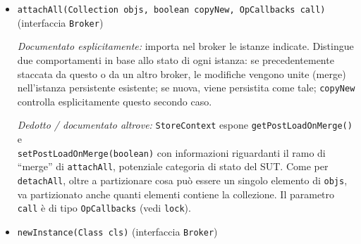 \begin{itemize}[itemsep=12pt, parsep=7pt]
    \textit{Dedotto / documentato altrove:} tramite collegamento con il Javadoc di
    \texttt{Broker.isDetached(Object obj)} si può affermare che ogni istanza restituita
    soddisfa \texttt{isDetached(e)=true}. \texttt{Broker} espone altri due overload di \texttt{detachAll}: uno
    senza collezione (stacca tutti gli oggetti gestiti, con flush sempre eseguito prima) e
    uno con un parametro \texttt{flush} booleano che rende quel flush opzionale. Il flush cui questi overload si
    riferiscono è documentato dal metodo pubblico \texttt{Broker.flush()}. \texttt{Broker} estende anche
    \texttt{DetachState}, che dichiara le modalità di detach (\texttt{DETACH\_FETCH\_GROUPS}:
    solo i campi del fetch group corrente; \texttt{DETACH\_LOADED}: tutti i campi già
    caricati; \texttt{DETACH\_ALL}: tutti i campi). \texttt{StoreContext} espone la coppia
    \texttt{getDetachState()}/\texttt{setDetachState(int)}, il cui Javadoc documenta il
    default: \texttt{DETACH\_LOADED}. Oltre a partizionare cosa può essere un singolo
    elemento di \texttt{objs} (istanza valida, nulla, ecc.), il tipo dichiarato
    (\texttt{Collection}) permette di partizionare anche quanti elementi contiene la
    collezione. Il
    parametro \texttt{call} è di tipo \texttt{OpCallbacks} (vedi \texttt{lock}).

    \item \texttt{attachAll(Collection objs, boolean copyNew, OpCallbacks call)}
    (interfaccia \texttt{Broker})

    \textit{Documentato esplicitamente:} importa nel broker le istanze indicate. Distingue
    due comportamenti in base allo stato di ogni istanza: se precedentemente staccata da
    questo o da un altro broker, le modifiche vengono unite (merge) nell'istanza persistente
    esistente; se nuova, viene persistita come tale; \texttt{copyNew} controlla
    esplicitamente questo secondo caso.

    \textit{Dedotto / documentato altrove:} \texttt{StoreContext} espone
    \texttt{getPostLoadOnMerge()} e \\ \texttt{setPostLoadOnMerge(boolean)} con informazioni riguardanti il ramo di
    ``merge'' di \texttt{attachAll}, potenziale categoria di stato del SUT.
    Come per \texttt{detachAll}, oltre a partizionare
    cosa può essere un singolo elemento di \texttt{objs}, va partizionato anche quanti
    elementi contiene la collezione. Il parametro \texttt{call} è di tipo \texttt{OpCallbacks}
    (vedi \texttt{lock}).

    \item \texttt{newInstance(Class cls)}
    (interfaccia \texttt{Broker})


\end{itemize}
